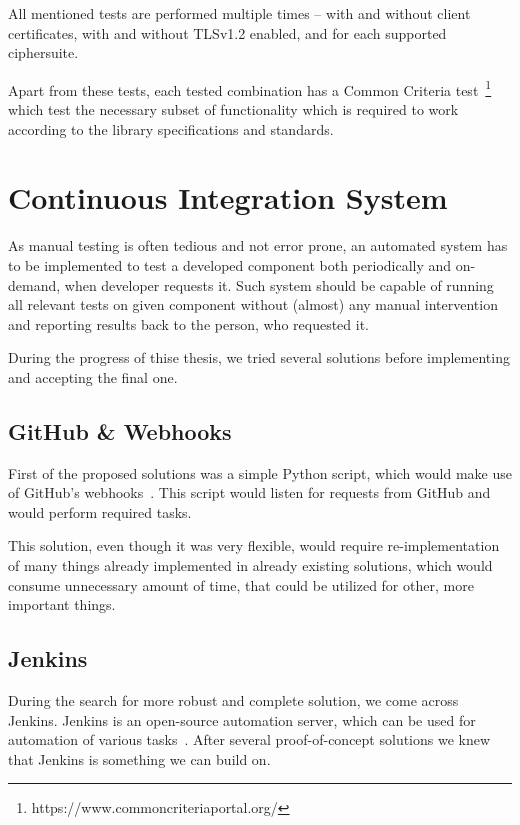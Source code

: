     All mentioned tests are performed multiple times -- with and without
    client certificates, with and without TLSv1.2 enabled, and for each
    supported ciphersuite.

    Apart from these tests, each tested combination has a Common Criteria
    test~\footnote{https://www.commoncriteriaportal.org/} which test
    the necessary subset of functionality which is required to work according
    to the library specifications and standards.

\section{Continuous Integration System}
    As manual testing is often tedious and not error prone, an automated system
    has to be implemented to test a developed component both periodically and
    on-demand, when developer requests it. Such system should be capable of
    running all relevant tests on given component without (almost) any manual
    intervention and reporting results back to the person, who requested
    it.~\cite{amazon-ci}

    During the progress of thise thesis, we tried several solutions before
    implementing and accepting the final one.

\subsection{GitHub \& Webhooks}
    First of the proposed solutions was a simple Python script, which would
    make use of GitHub's webhooks~\cite{github-webhooks}. This script would listen
    for requests from GitHub and would perform required tasks.

    This solution, even though it was very flexible, would require re-implementation
    of many things already implemented in already existing solutions, which would
    consume unnecessary amount of time, that could be utilized for other, more important things.

\subsection{Jenkins}
    During the search for more robust and complete solution, we come across
    Jenkins. Jenkins is an open-source automation server, which can be used
    for automation of various tasks~\cite{jenkins-docs}. After several
    proof-of-concept solutions we knew that Jenkins is something we can
    build on.

